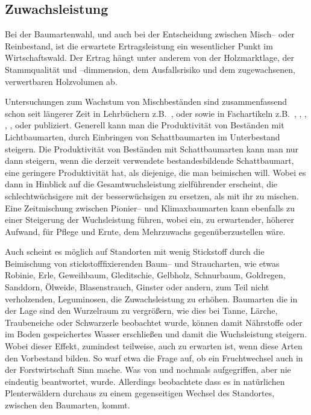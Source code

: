 \documentclass[twocolumn]{scrartcl}
\begin{document}
\subsection{Zuwachsleistung}
\label{ssec:zuwachs}

Bei der Baumartenwahl, und auch bei der Entscheidung zwischen Misch--
oder Reinbestand, ist die erwartete Ertragsleistung ein wesentlicher
Punkt im Wirtschaftswald. Der Ertrag hängt unter anderem von der
Holzmarktlage, der Stammqualität und --dimmension, dem Ausfallsrisiko
und dem zugewachsenen, verwertbaren Holzvolumen ab.

Untersuchungen zum Wachstum von Mischbeständen sind zusammenfassend
schon seit längerer Zeit in Lehrbüchern z.B.\
\cite{wiedemann1951Ertragskunde}, \cite{assmann1961Waldertraskunde}
oder \cite{mitscherlich1978WaldWachstumUmwelt} sowie in Fachartikeln
z.B.\ \cite{baader1942WasLeistetDerMischbestand},
\cite{kennel1965MischbestandFichteBuche},
\cite{mitscherlich196566ReinUndMischbestand},
\cite{guericke2001mischungBuLae}, \cite{pretzsch2003mischwald},
\cite{bauhus2004mischung} oder \cite{kelty2006mischwald}
publiziert. Generell kann man die Produktivität von Beständen mit
Lichtbaumarten, durch Einbringen von Schattbaumarten im Unterbestand
steigern. Die Produktivität von Beständen mit Schattbaumarten kann man
nur dann steigern, wenn die derzeit verwendete bestandesbildende
Schattbaumart, eine geringere Produktivität hat, als diejenige, die
man beimischen will. Wobei es dann in Hinblick auf die
Gesamtwuchsleistung zielführender erscheint, die schlechtwüchsigere
mit der besserwüchsigen zu ersetzen, als mit ihr zu mischen. Eine
Zeitmischung zwischen Pionier-- und Klimaxbaumarten kann ebenfalls zu
einer Steigerung der Wuchsleistung führen, wobei ein, zu erwartender,
höherer Aufwand, für Pflege und Ernte, dem Mehrzuwachs
gegenüberzustellen wäre.

Auch scheint es möglich auf Standorten mit wenig Stickstoff durch die
Beimischung von stickstofffixierenden Baum-- und Straucharten, wie
etwas Robinie, Erle, Geweihbaum, Gleditschie, Gelbholz, Schnurbaum,
Goldregen, Sanddorn, Ölweide, Blasenstrauch, Ginster oder andern, zum
Teil nicht verholzenden, Leguminosen, die Zuwachsleistung zu
erhöhen. Baumarten die in der Lage sind den Wurzelraum zu vergrößern,
wie dies bei Tanne, Lärche, Traubeneiche oder Schwarzerle
\cite[S.~114, 130, 150, 180]{koestler1969WurzelnDerWaldbaeume}
beobachtet wurde, können damit Nährstoffe oder im Boden gespeichertes
Wasser erschließen und damit die Wuchsleistung steigern. Wobei dieser
Effekt, zumindest teilweise, auch zu erwarten ist, wenn diese Arten
den Vorbestand bilden. So warf etwa \cite{jentsch1911fruchtwechsel}
die Frage auf, ob ein Fruchtwechsel auch in der Forstwirtschaft Sinn
mache. Was von \cite{sieber1919Holzartenwechsel} und
\cite{fabricius1924Holzartenwechsel} nochmals aufgegriffen, aber nie
eindeutig beantwortet, wurde. Allerdings beobachtete
\cite{simak1951Baumartenwechsel} dass es in natürlichen Plenterwäldern
durchaus zu einem gegenseitigen Wechsel des Standortes, zwischen den
Baumarten, kommt.
\end{document}
